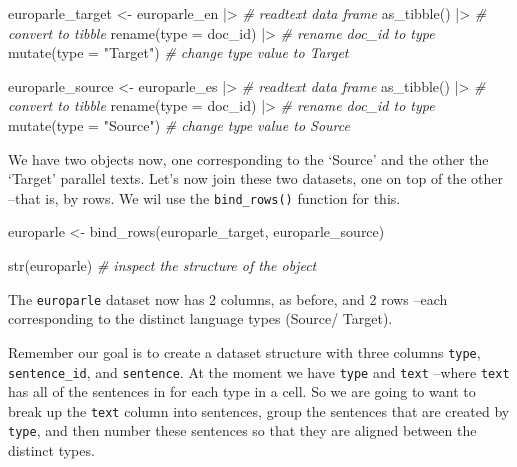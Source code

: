 \documentclass[
  letterpaper,
  DIV=11,
  numbers=noendperiod]{scrreport}
\newenvironment{Shaded}{\begin{snugshade}}{\end{snugshade}}
\newcommand{\AttributeTok}[1]{\textcolor[rgb]{0.00,0.00,0.00}{#1}}
\newcommand{\CommentTok}[1]{\textcolor[rgb]{0.00,0.00,0.00}{\textit{#1}}}
\newcommand{\FunctionTok}[1]{\textcolor[rgb]{0.00,0.00,0.00}{#1}}
\newcommand{\NormalTok}[1]{\textcolor[rgb]{0.00,0.00,0.00}{#1}}
\newcommand{\OtherTok}[1]{\textcolor[rgb]{0.00,0.00,0.00}{#1}}
\newcommand{\SpecialCharTok}[1]{\textcolor[rgb]{0.00,0.00,0.00}{#1}}
\newcommand{\StringTok}[1]{\textcolor[rgb]{0.00,0.00,0.00}{#1}}
\theoremstyle{definition}
\theoremstyle{remark}
\begin{document}
\begin{Shaded}
\begin{Highlighting}[]
\NormalTok{europarle\_target }\OtherTok{\textless{}{-}} 
\NormalTok{  europarle\_en }\SpecialCharTok{|\textgreater{}} \CommentTok{\# readtext data frame}
  \FunctionTok{as\_tibble}\NormalTok{() }\SpecialCharTok{|\textgreater{}} \CommentTok{\# convert to tibble}
  \FunctionTok{rename}\NormalTok{(}\AttributeTok{type =}\NormalTok{ doc\_id) }\SpecialCharTok{|\textgreater{}} \CommentTok{\# rename doc\_id to type}
  \FunctionTok{mutate}\NormalTok{(}\AttributeTok{type =} \StringTok{"Target"}\NormalTok{) }\CommentTok{\# change type value to \textquotesingle{}Target\textquotesingle{}}

\NormalTok{europarle\_source }\OtherTok{\textless{}{-}} 
\NormalTok{  europarle\_es }\SpecialCharTok{|\textgreater{}} \CommentTok{\# readtext data frame}
  \FunctionTok{as\_tibble}\NormalTok{() }\SpecialCharTok{|\textgreater{}} \CommentTok{\# convert to tibble}
  \FunctionTok{rename}\NormalTok{(}\AttributeTok{type =}\NormalTok{ doc\_id) }\SpecialCharTok{|\textgreater{}} \CommentTok{\# rename doc\_id to type}
  \FunctionTok{mutate}\NormalTok{(}\AttributeTok{type =} \StringTok{"Source"}\NormalTok{) }\CommentTok{\# change type value to \textquotesingle{}Source\textquotesingle{}}
\end{Highlighting}
\end{Shaded}

We have two objects now, one corresponding to the `Source' and the other
the `Target' parallel texts. Let's now join these two datasets, one on
top of the other --that is, by rows. We wil use the
\texttt{bind\_rows()} function for this.

\begin{Shaded}
\begin{Highlighting}[]
\NormalTok{europarle }\OtherTok{\textless{}{-}} 
  \FunctionTok{bind\_rows}\NormalTok{(europarle\_target, europarle\_source)}

\FunctionTok{str}\NormalTok{(europarle) }\CommentTok{\# inspect the structure of the object}
\end{Highlighting}
\end{Shaded}

The \texttt{europarle} dataset now has 2 columns, as before, and 2 rows
--each corresponding to the distinct language types (Source/ Target).

Remember our goal is to create a dataset structure with three columns
\texttt{type}, \texttt{sentence\_id}, and \texttt{sentence}. At the
moment we have \texttt{type} and \texttt{text} --where \texttt{text} has
all of the sentences in for each type in a cell. So we are going to want
to break up the \texttt{text} column into sentences, group the sentences
that are created by \texttt{type}, and then number these sentences so
that they are aligned between the distinct types.
\end{document}
